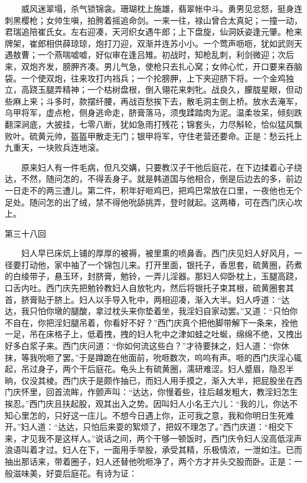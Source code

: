 　　威风迷翠塌，杀气锁锦衾。珊瑚枕上施雄，翡翠帐中斗。勇男见忿怒，挺身连刺黑樱枪；女帅生嗔，拍胯着摇追命剑。一来一往，禄山曾合太真妃；一撞一动，君瑞追陪崔氏女。左右迎凑，天河织女遇牛郎；上下盘旋，仙洞妖姿逢元肇。枪来牌架，崔郎相供薛琼琼，炮打刀迎，双渐并连苏小小。一个莺声呖呖，犹如武则天遇敖曹；一个燕喘嘘嘘，好似审在逢吕雉。初战时，知枪乱刺，利剑微迎；次后来，双炮齐发，膀胛齐凑。男儿气急，使枪只去扎心窝；女帅心忙，开口要来吞脑袋。一个使双炮，往来攻打内裆兵；一个抡膀胛，上下夹迎脐下将。一个金鸡独立，高跷玉腿弄精神；一个枯树盘根，倒入翎花来刺牝。战良久，朦胧星眼，但动些麻上来；斗多时，款摆纤腰，再战百愁挨下去，散毛洞主倒上桥。放水去淹军，乌甲将军，虚点枪，侧身逃命走，脐膏落马，须曳蹂踏肉为泥。温柔妆呆，倾刻跌翻深涧底，大披挂，七零八断，犹如急雨打残花；锦套头，力尽斛轮，恰似猛风飘败叶。硫黄元帅，盔盔甲散走无门；银甲将军，守住老营还要命。正是：愁云托上九重天，一块败兵连地滚。

　　原来妇人有一件毛病，但凡交媾，只要教汉子干他后庭花，在下边揉着心子绕达，不然，随问怎的，不得丢身子。就是韩道国与他相合，倒是后边去的多，前边一日走不的两三遭儿。第二件，积年好咂鸡巴，把鸡巴常放在口里，一夜他也无个足处。随问怎的出了绒，禁不得他吮舔挑弄，登时就起。这两椿，可在西门庆心坎上。


第三十八回

　　妇人早已床炕上铺的厚厚的被褥，被里熏的喷鼻香。西门庆见妇人好风月，一径要打动他，家中袖了一个锦包儿来。打开里面，银托子，香思套，硫黄圈，药煮的白绫带子，悬玉环，封脐膏，勉铃，一弄儿淫器。那妇人仰卧枕上，玉腿高跷，口舌内吐。西门庆先把勉铃教妇人自放牝内，然后将银托子束其根，硫黄圈套其首，脐膏贴于脐上。妇人以手导入牝中，两相迎凑，渐入大半。妇人呼道：“达达，我只怕你墩的腿酸，拿过枕头来你垫着坐，我淫妇自家动罢。”又道：“只怕你不自在，你把淫妇腿吊着，你看好不好？”西门庆真个把他脚带解下一条来，拴他一足，吊在床格子上，低着拽，拽的妇人牝中之津如蛙之吐蜒，绵绵不绝，又拽出好多白浆子来。西门庆问道：“你如何流这些白？”才待要抹之，妇人道：“你休抹，等我吮咂了罢。”于是蹲跪在他面前，吮咂数次，呜呜有声。咂的西门庆淫心辄起，吊过身子，两个干后庭花。龟头上有硫黄圈，濡研难涩。妇人蹙眉，隐忍半晌，仅没其棱。西门庆于是颇作抽已，而妇人用手摸之，渐入大半，把屁股坐在西门庆怀里，回首流眸，作颤声叫：“达达，你慢着些，往后越发粗大，教淫妇怎生挨忍。”西门庆且扶起股，观其出入之势。因叫妇人小名王六儿：“我的儿，你达不知心里怎的，只好这一庄儿。不想今日遇上你，正可我之意，我和你明日生死难开。”妇人道：“达达，只怕后来耍的絮烦了，把奴不理怎了。”西门庆道：“相交下来，才见我不是这样人。”说话之间，两个干够一顿饭时，西门庆令妇人没高低淫声浪语叫着才过。妇人在下，一面用手举股，承受其精，乐极情浓，一泄如注。已而抽出那话来，带着圈子，妇人还替他吮咂净了，两个方才并头交股而卧。正是：一般滋味美，好耍后庭花。有诗为证：

